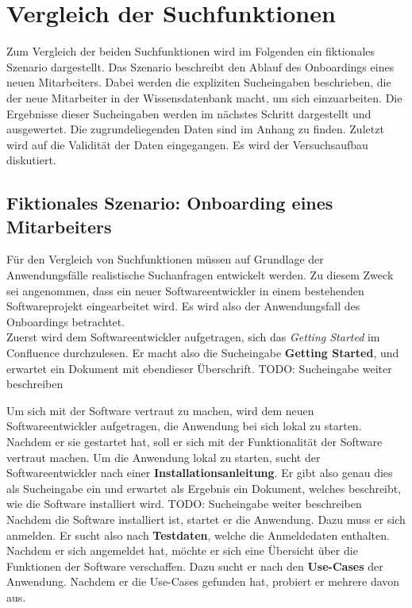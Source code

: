 \chapter{Vergleich der Suchfunktionen}
\label{chap:vergleich-der-suchfunktionen}

Zum Vergleich der beiden Suchfunktionen wird im Folgenden ein fiktionales Szenario dargestellt.
Das Szenario beschreibt den Ablauf des Onboardings eines neuen Mitarbeiters.
Dabei werden die expliziten Sucheingaben beschrieben, die der neue Mitarbeiter in der Wissensdatenbank macht, um sich einzuarbeiten.
Die Ergebnisse dieser Sucheingaben werden im nächstes Schritt dargestellt und ausgewertet.
Die zugrundeliegenden Daten sind im Anhang zu finden.
Zuletzt wird auf die Validität der Daten eingegangen.
Es wird der Versuchsaufbau diskutiert.

\section{Fiktionales Szenario: Onboarding eines Mitarbeiters}

Für den Vergleich von Suchfunktionen müssen auf Grundlage der Anwendungsfälle realistische Suchanfragen entwickelt werden.
Zu diesem Zweck sei angenommen, dass ein neuer Softwareentwickler in einem bestehenden Softwareprojekt eingearbeitet wird.
Es wird also der Anwendungsfall des Onboardings betrachtet.\\

Zuerst wird dem Softwareentwickler aufgetragen, sich das \textit{Getting Started} im Confluence durchzulesen.
Er macht also die Sucheingabe \textbf{Getting Started}, und erwartet ein Dokument mit ebendieser Überschrift. 
TODO: Sucheingabe weiter beschreiben

Um sich mit der Software vertraut zu machen, wird dem neuen Softwareentwickler aufgetragen, die Anwendung bei sich lokal zu starten.
Nachdem er sie gestartet hat, soll er sich mit der Funktionalität der Software vertraut machen.
Um die Anwendung lokal zu starten, sucht der Softwareentwickler nach einer \textbf{Installationsanleitung}.
Er gibt also genau dies als Sucheingabe ein und erwartet als Ergebnis ein Dokument, welches beschreibt, wie die Software installiert wird.
TODO: Sucheingabe weiter beschreiben\\

Nachdem die Software installiert ist, startet er die Anwendung.
Dazu muss er sich anmelden.
Er sucht also nach \textbf{Testdaten}, welche die Anmeldedaten enthalten.
Nachdem er sich angemeldet hat, möchte er sich eine Übersicht über die Funktionen der Software verschaffen.
Dazu sucht er nach den \textbf{Use-Cases} der Anwendung.
Nachdem er die Use-Cases gefunden hat, probiert er mehrere davon aus.\\

